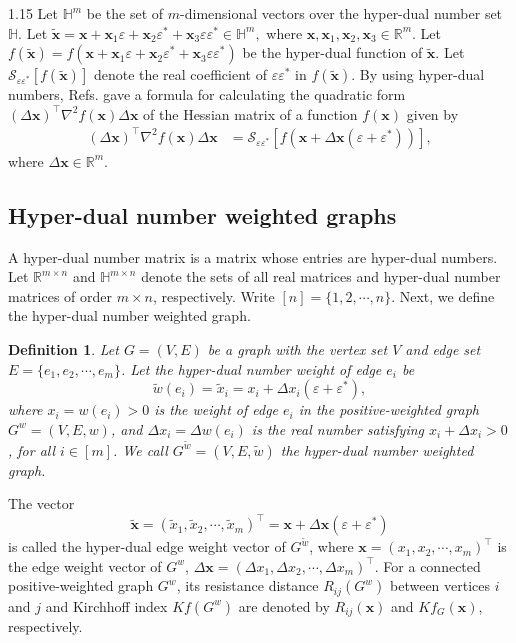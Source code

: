 \documentclass[preprint,12pt]{elsarticle1}
\newtheorem{prou}[thm]{Definition}
\numberwithin{equation}{section}
\begin{document}
\begin{spacing}{1.15}
Let $\mathbb{H}^{m}$ be the set of
$m$-dimensional vectors over the hyper-dual number set $\mathbb{H}$. Let $\widetilde{\textbf{x}}=\textbf{x}+\textbf{x}_{1}\varepsilon+\textbf{x}_{2}\varepsilon^{*}+\textbf{x}_{3}\varepsilon\varepsilon^{*}\in \mathbb{H}^{m},$ where $\textbf{x},\textbf{x}_{1},\textbf{x}_{2},\textbf{x}_{3}\in\mathbb{R}^{m}$.
Let $f(\widetilde{\textbf{x}})=f(\textbf{x}+\textbf{x}_{1}\varepsilon+ \textbf{x}_{2}\varepsilon^{*}+ \textbf{x}_{3}\varepsilon\varepsilon^{*})$ be the hyper-dual function of
$\widetilde{\textbf{x}}$. Let
 $\mathcal{S}_{\varepsilon\varepsilon^{*}}[f(\widetilde{\mathbf{x}})]$
denote the real coefficient of $\varepsilon\varepsilon^{*}$ in $f(\widetilde{\mathbf{x}})$.
By using hyper-dual numbers, Refs. \cite{fike2011development,tanaka2015highly} gave a formula for calculating  the quadratic form  $(\Delta \textbf{x})^{\top}\nabla^{2}f(\textbf{x})\Delta \textbf{x}$ of the Hessian matrix of a  function $f(\textbf{x})$ given by
\begin{align}
\label{jiq2}
(\Delta \textbf{x})^{\top}\nabla^{2}f(\textbf{x})\Delta \textbf{x}&=\mathcal{S}_{\varepsilon\varepsilon^{*}}[f(\textbf{x} +\Delta \textbf{x}(\varepsilon+\varepsilon^{*}))],
\end{align}
where $\Delta \textbf{x}\in\mathbb{R}^{m}.$
\subsection{Hyper-dual number weighted graphs}
A hyper-dual number matrix is a matrix whose entries are hyper-dual numbers. Let $\mathbb{R}^{m\times n}$ and $\mathbb{H}^{m\times n}$ denote the sets of all real matrices and hyper-dual number matrices of order $m\times n$, respectively.
Write $[n]=\{1,2,\cdots,n\}$. Next, we define the hyper-dual  number weighted graph.

\begin{prou}
Let $G=(V,E)$ be a graph with the vertex set $V$ and edge set
$E=\{e_{1},e_{2},\cdots,e_{m}\}$. Let the hyper-dual number weight of  edge $e_{i}$ be $$\widetilde{w}(e_{i})=\widetilde{x}_{i}=x_{i}+\Delta x_{i}(\varepsilon+\varepsilon^{*}),
$$ where  $x_{i}=w(e_{i})>0$ is the weight of edge $e_{i}$ in the  positive-weighted graph $G^{w}=(V,E,w)$, and  $\Delta x_{i}= \Delta w(e_{i})$ is the real number satisfying  $x_{i}+\Delta x_{i}>0$, for all $i\in[m]$.  We call $G^{\widetilde{w}}=(V,E,\widetilde{w})$ the hyper-dual number weighted graph.
\end{prou}
The vector  $$\widetilde{\textbf{x}}=(\widetilde{x}_{1},\widetilde{x}_{2},
\cdots,\widetilde{x}_{m})^{\top}=\textbf{x}+\Delta\textbf{x}
(\varepsilon+\varepsilon^{*})$$ is called the hyper-dual edge weight vector of
$G^{\widetilde{w}}$, where $\mathbf{x}=(x_{1},x_{2},\cdots,x_{m})^{\top}$ is the edge weight vector of
$G^{w}$, $\Delta \mathbf{x}=(\Delta x_{1}, \Delta x_{2},\cdots, \Delta x_{m})^{\top}$. For a connected  positive-weighted graph $G^{w}$,  its resistance distance $R_{ij}(G^{w})$ between vertices  $i$ and $j$ and  Kirchhoff index $Kf(G^{w})$ are denoted by  $R_{ij}(\textbf{x})$ and $Kf_{G}(\textbf{x})$, respectively.


\end{spacing}
\end{document}
